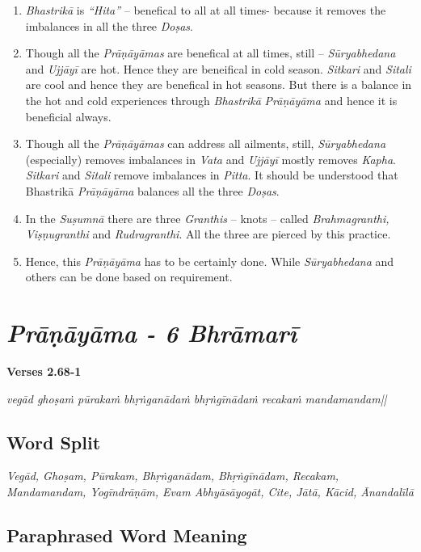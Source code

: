 \begin{enumerate}
\item  \textit{Bhastrikā} is \textit{“Hita”} – benefical to all at all times- because it removes the imbalances in all the three  \textit{Doṣas}. 
\item Though all the \textit{Prāṇāyāmas} are benefical at all times, still – \textit{Sūryabhedana} and \textit{Ujjāyī} are hot. Hence they are beneifical in cold season.  \textit{Sitkari} and  \textit{Sitali} are cool and hence they are benefical in hot seasons.  But there is a balance in the hot and cold experiences through  \textit{Bhastrikā} \textit{Prāṇāyāma} and hence it is beneficial always. 
\item Though all the \textit{Prāṇāyāmas} can address all ailments, still,  \textit{Sūryabhedana} (especially) removes imbalances in  \textit{Vata} and \textit{Ujjāyī} mostly removes \textit{Kapha}.  \textit{Sitkari} and  \textit{Sitali} remove imbalances in  \textit{Pitta}. It should be understood that Bhastrikā \textit{Prāṇāyāma} balances all the three  \textit{Doṣas}.  
\item In the  \textit{Suṣumnā} there are three  \textit{Granthis} – knots – called  \textit{Brahmagranthi, Viṣṇugranthi} and  \textit{Rudragranthi}.  All the three are pierced by this practice. 
\item Hence, this \textit{Prāṇāyāma} has to be certainly done. While  \textit{Sūryabhedana} and others can be done based on requirement.
\end{enumerate}
\newpage
    
\section*{\textit{Prāṇāyāma - 6 Bhrāmarī}}

\noindent \textbf{Verses 2.68-1}

\textit{vegād ghoṣaṁ pūrakaṁ bhṛṅganādaṁ  bhṛṅgīnādaṁ recakaṁ manda\-mandam||}

\subsection*{Word Split}


\textit{Vegād, Ghoṣam, Pūrakam, Bhṛṅganādam, Bhṛṅgīnādam, Recakam, Mandamandam, Yogīndrāṇām, Evam Abhyāsāyogāt, Cite, Jātā, Kācid, Ānandalīlā}

\subsection*{Paraphrased Word Meaning}


